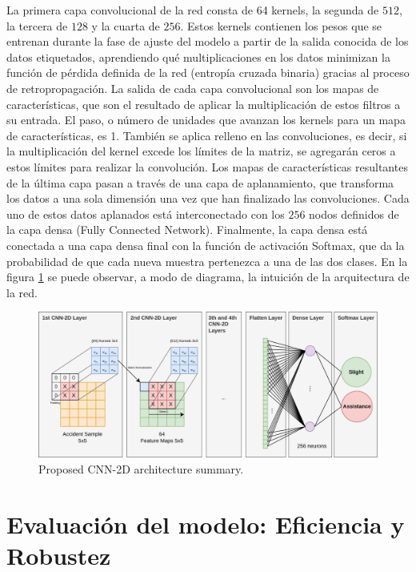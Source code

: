 \documentclass{uathesis-es}
\begin{document}
{	La primera capa convolucional de la red consta de 64 kernels, la segunda de $512$, la tercera de $128$ y la cuarta de $256$. Estos kernels contienen los pesos que se entrenan durante la fase de ajuste del modelo a partir de la salida conocida de los datos etiquetados, aprendiendo qué multiplicaciones en los datos minimizan la función de pérdida definida de la red (entropía cruzada binaria) gracias al proceso de retropropagación. La salida de cada capa convolucional son los mapas de características, que son el resultado de aplicar la multiplicación de estos filtros a su entrada. El paso, o número de unidades que avanzan los kernels para un mapa de características, es 1. También se aplica relleno en las convoluciones, es decir, si la multiplicación del kernel excede los límites de la matriz, se agregarán ceros a estos límites para realizar la convolución. Los mapas de características resultantes de la última capa pasan a través de una capa de aplanamiento, que transforma los datos a una sola dimensión una vez que han finalizado las convoluciones. Cada uno de estos datos aplanados está interconectado con los $256$ nodos definidos de la capa densa (Fully Connected Network). Finalmente, la capa densa está conectada a una capa densa final con la función de activación Softmax, que da la probabilidad de que cada nueva muestra pertenezca a una de las dos clases. En la figura \ref{CNN2DArchitecture} se puede observar, a modo de diagrama, la intuición de la arquitectura de la red.
	
	\begin{figure}[H]
		\centering
		\includegraphics[width=15cm]{Figures/SIMPLE.png}
		\caption{Proposed CNN-2D architecture summary.}
		\label{CNN2DArchitecture}
	\end{figure}
	
	
	\section{Evaluación del modelo: Eficiencia y Robustez}
	
}
\end{document}
